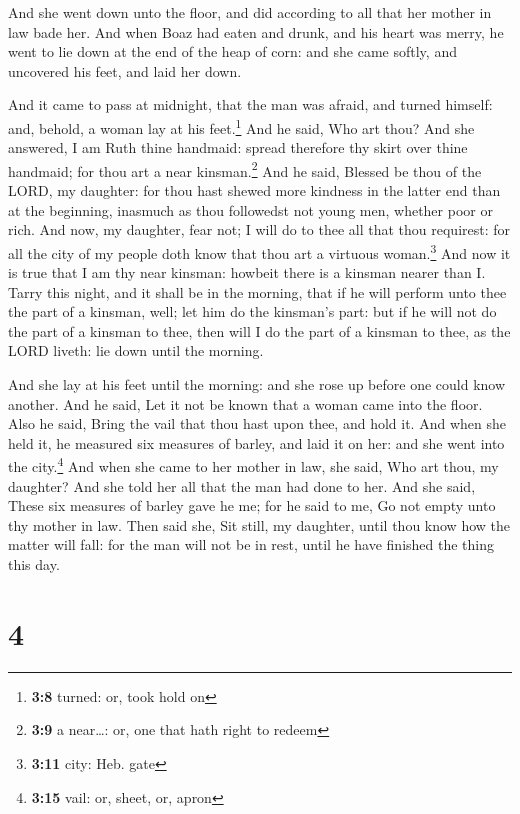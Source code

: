  And she went down unto the floor, and did according to
all that her mother in law bade her.  And when Boaz had
eaten and drunk, and his heart was merry, he went to lie down at the end
of the heap of corn: and she came softly, and uncovered his feet, and
laid her down.

 And it came to pass at midnight, that the man was afraid,
and turned himself: and, behold, a woman lay at his feet.\footnote{\textbf{3:8}
  turned: or, took hold on}  And he said, Who art thou?
And she answered, I am Ruth thine handmaid: spread therefore thy skirt
over thine handmaid; for thou art a near kinsman.\footnote{\textbf{3:9}
  a near\ldots: or, one that hath right to redeem}  And
he said, Blessed be thou of the LORD, my daughter: for thou hast shewed
more kindness in the latter end than at the beginning, inasmuch as thou
followedst not young men, whether poor or rich.  And now,
my daughter, fear not; I will do to thee all that thou requirest: for
all the city of my people doth know that thou art a virtuous
woman.\footnote{\textbf{3:11} city: Heb. gate}  And now
it is true that I am thy near kinsman: howbeit there is a kinsman nearer
than I.  Tarry this night, and it shall be in the
morning, that if he will perform unto thee the part of a kinsman, well;
let him do the kinsman's part: but if he will not do the part of a
kinsman to thee, then will I do the part of a kinsman to thee, as the
LORD liveth: lie down until the morning.

 And she lay at his feet until the morning: and she rose
up before one could know another. And he said, Let it not be known that
a woman came into the floor.  Also he said, Bring the
vail that thou hast upon thee, and hold it. And when she held it, he
measured six measures of barley, and laid it on her: and she went into
the city.\footnote{\textbf{3:15} vail: or, sheet, or, apron}
 And when she came to her mother in law, she said, Who
art thou, my daughter? And she told her all that the man had done to
her.  And she said, These six measures of barley gave he
me; for he said to me, Go not empty unto thy mother in law.
 Then said she, Sit still, my daughter, until thou know
how the matter will fall: for the man will not be in rest, until he have
finished the thing this day.

\hypertarget{section-3}{%
\section{4}\label{section-3}}

